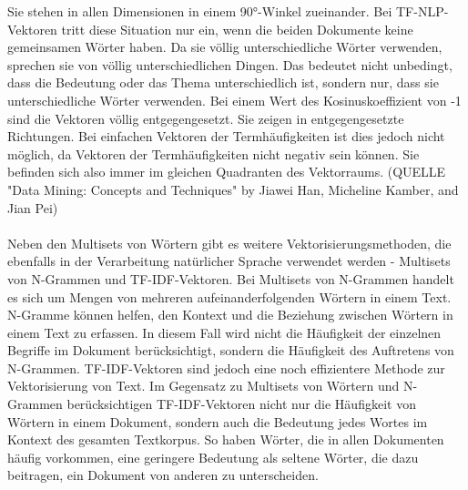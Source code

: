 Sie stehen in allen Dimensionen in einem 90°-Winkel zueinander. 
Bei \ac{TF}-\ac{NLP}-Vektoren tritt diese Situation nur ein, wenn die beiden Dokumente keine gemeinsamen Wörter haben. 
Da sie völlig unterschiedliche Wörter verwenden, sprechen sie von völlig unterschiedlichen Dingen. 
Das bedeutet nicht unbedingt, dass die Bedeutung oder das Thema unterschiedlich ist, sondern nur, dass sie unterschiedliche Wörter verwenden. 
Bei einem Wert des Kosinuskoeffizient von -1 sind die Vektoren völlig entgegengesetzt. 
Sie zeigen in entgegengesetzte Richtungen. 
Bei einfachen Vektoren der Termhäufigkeiten ist dies jedoch nicht möglich, da Vektoren der Termhäufigkeiten nicht negativ sein können. 
Sie befinden sich also immer im gleichen Quadranten des Vektorraums. (QUELLE "Data Mining: Concepts and Techniques" by Jiawei Han, Micheline Kamber, and Jian Pei)\\\\
Neben den Multisets von Wörtern gibt es weitere Vektorisierungsmethoden, die ebenfalls in der Verarbeitung natürlicher Sprache verwendet werden - Multisets von N-Grammen und \ac{TF-IDF}-Vektoren.
Bei Multisets von N-Grammen handelt es sich um Mengen von mehreren aufeinanderfolgenden Wörtern in einem Text. 
N-Gramme können helfen, den Kontext und die Beziehung zwischen Wörtern in einem Text zu erfassen. 
In diesem Fall wird nicht die Häufigkeit der einzelnen Begriffe im Dokument berücksichtigt, sondern die Häufigkeit des Auftretens von N-Grammen.
\ac{TF-IDF}-Vektoren sind jedoch eine noch effizientere Methode zur Vektorisierung von Text. 
Im Gegensatz zu Multisets von Wörtern und N-Grammen berücksichtigen \ac{TF-IDF}-Vektoren nicht nur die Häufigkeit von Wörtern in einem Dokument, sondern auch die Bedeutung jedes Wortes im Kontext des gesamten Textkorpus. 
So haben Wörter, die in allen Dokumenten häufig vorkommen, eine geringere Bedeutung als seltene Wörter, die dazu beitragen, ein Dokument von anderen zu unterscheiden.
